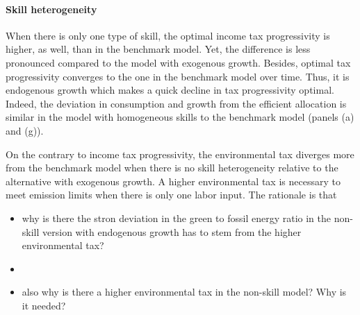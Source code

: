 \paragraph{Skill heterogeneity}
When there is only one type of skill, the optimal income tax progressivity is higher, as well, than in the benchmark model. Yet, the difference is less pronounced compared to the model with exogenous growth. Besides, optimal tax progressivity converges to the one in the benchmark model over time. Thus, it is endogenous growth which makes a quick decline in tax progressivity optimal. 
Indeed, the deviation in consumption and growth from the efficient allocation is similar in the model with homogeneous skills to the benchmark model (panels (a) and (g)). 

On the contrary to income tax progressivity, the environmental tax diverges more from the benchmark model when there is no skill heterogeneity relative to the alternative with exogenous growth.
A higher environmental tax is necessary to meet emission limits when there is only one labor input. The rationale is that  

\begin{itemize}
	\item why is there the stron deviation in the green to fossil energy ratio in the non-skill version with endogenous growth \ar has to stem from the higher environmental tax?
	\item {}
	\item also why is there a higher environmental tax in the non-skill model? Why is it needed?
\end{itemize}


